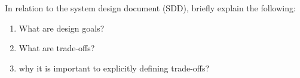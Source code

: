 In relation to the system design document (SDD), briefly explain the following:

\begin{enumerate}
    \item {} What are design goals?
        \newline\answer\questionSevenAnswerA
    \item {} What are trade-offs?
        \newline\answer\questionSevenAnswerB
    \item {} why it is important to explicitly defining trade-offs? 
        \newline\answer\questionSevenAnswerC
\end{enumerate}